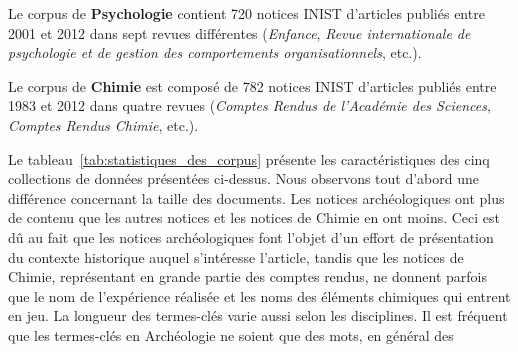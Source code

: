   Le corpus de \textbf{Psychologie} contient 720 notices INIST d'articles
  publiés entre 2001 et 2012 dans sept revues différentes
  (\textit{Enfance}, \textit{Revue internationale de psychologie et de gestion
  des comportements organisationnels}, etc.).

  Le corpus de \textbf{Chimie} est composé de 782 notices INIST d'articles
  publiés entre 1983 et 2012 dans quatre revues (\textit{Comptes Rendus de
  l'Académie des Sciences}, \textit{Comptes Rendus Chimie}, etc.).

  Le tableau~\ref{tab:statistiques_des_corpus} présente les caractéristiques des
  cinq collections de données présentées ci-dessus. Nous observons tout d'abord
  une différence concernant la taille des documents. Les notices archéologiques
  ont plus de contenu que les autres notices et les notices de Chimie en ont
  moins. Ceci est dû au fait que les notices archéologiques font l'objet d'un
  effort de présentation du contexte historique auquel s'intéresse l'article,
  tandis que les notices de Chimie, représentant en grande partie des comptes
  rendus, ne donnent parfois que le nom de l'expérience réalisée et les noms
  des éléments chimiques qui entrent en jeu. %
  La longueur des termes-clés varie aussi selon les disciplines. Il est fréquent
  que les termes-clés en Archéologie ne soient que des mots, en général des
